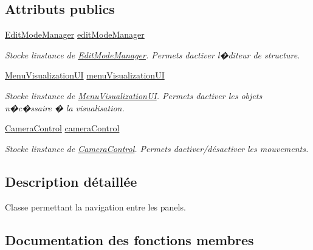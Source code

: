 \subsection*{Attributs publics}
\begin{DoxyCompactItemize}
\item 
\mbox{\hyperlink{class_edit_mode_manager}{Edit\+Mode\+Manager}} \mbox{\hyperlink{class_navigation_a59344933bd9a22b16612407dee4e8aa5}{edit\+Mode\+Manager}}
\begin{DoxyCompactList}\small\item\em Stocke l\textquotesingle{}instance de \mbox{\hyperlink{class_edit_mode_manager}{Edit\+Mode\+Manager}}. Permets d\textquotesingle{}activer l\textquotesingle{}�diteur de structure. \end{DoxyCompactList}\item 
\mbox{\hyperlink{class_menu_visualization_u_i}{Menu\+Visualization\+UI}} \mbox{\hyperlink{class_navigation_affdf26928cacf9c7582cb21ff6bf85dd}{menu\+Visualization\+UI}}
\begin{DoxyCompactList}\small\item\em Stocke l\textquotesingle{}instance de \mbox{\hyperlink{class_menu_visualization_u_i}{Menu\+Visualization\+UI}}. Permets d\textquotesingle{}activer les objets n�c�ssaire � la visualisation. \end{DoxyCompactList}\item 
\mbox{\hyperlink{class_camera_control}{Camera\+Control}} \mbox{\hyperlink{class_navigation_a8ee62aef67edcc54d1478d20c22fff12}{camera\+Control}}
\begin{DoxyCompactList}\small\item\em Stocke l\textquotesingle{}instance de \mbox{\hyperlink{class_camera_control}{Camera\+Control}}. Permets d\textquotesingle{}activer/désactiver les mouvements. \end{DoxyCompactList}\end{DoxyCompactItemize}


\subsection{Description détaillée}
Classe permettant la navigation entre les panels. 



\subsection{Documentation des fonctions membres}
\mbox{\label{class_navigation_af687f3df18da0e95175b04fe5cc7da56}} 
